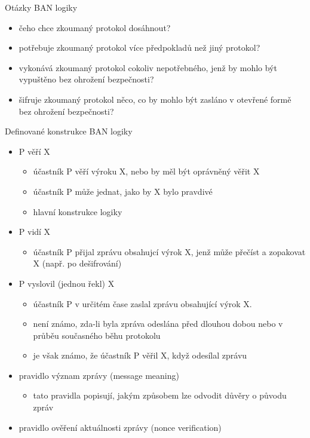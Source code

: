 Otázky BAN logiky
\begin{itemize}
    \item čeho chce zkoumaný protokol dosáhnout?
    \item potřebuje zkoumaný protokol více předpokladů než jiný protokol?
    \item vykonává zkoumaný protokol cokoliv nepotřebného, jenž by mohlo být vypuštěno bez ohrožení bezpečnosti?
    \item šifruje zkoumaný protokol něco, co by mohlo být zasláno v otevřené formě bez ohrožení bezpečnosti? \\
\end{itemize}

Definované konstrukce BAN logiky
\begin{itemize}
    \item P věří X
    \begin{itemize}
        \item účastník P věří výroku X, nebo by měl být oprávněný věřit X
        \item účastník P může jednat, jako by X bylo pravdivé
        \item hlavní konstrukce logiky
    \end{itemize}
    \item P vidí X
    \begin{itemize}
        \item účastník P přijal zprávu obsahujcí výrok X, jenž může přečíst a zopakovat X (např. po dešifrování)
    \end{itemize}
    \item P vyslovil (jednou řekl) X
    \begin{itemize}
        \item účastník P v určitém čase zaslal zprávu obsahující výrok X. 
        \item není známo, zda-li byla zpráva odeslána před dlouhou dobou nebo v průběu současného běhu protokolu
        \item je však známo, že účastník P věřil X, když odesílal zprávu \\
    \end{itemize}
    \item pravidlo význam zprávy (message meaning)
    \begin{itemize}
        \item tato pravidla popisují, jakým způsobem lze odvodit důvěry o původu zpráv
    \end{itemize}
    \item pravidlo ověření aktuálnosti zprávy (nonce verification)

\end{itemize}
